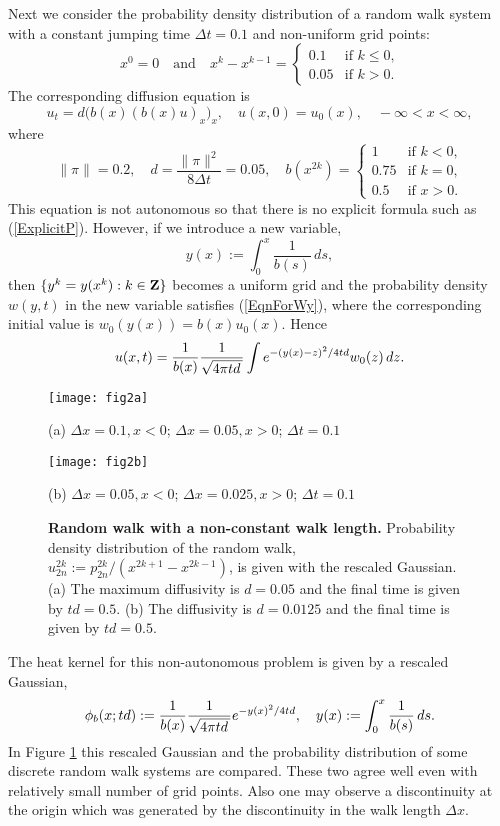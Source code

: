 \documentclass[11pt]{amsart}
\def\Z{\mathbb{Z}}
\def\d{d}
\def\Z{{\bf Z}}
\begin{document}
Next we consider the probability density distribution of a random walk system with a constant jumping time $\Delta t=0.1$ and non-uniform grid points:
\[
x^0=0\quad\text{and}\quad x^k-x^{k-1}=
\begin{cases}
0.1 & \text{if $k\leq 0$,}\\
0.05 & \text{if $k>0$.}
\end{cases}\]
The corresponding diffusion equation is
\begin{equation*}\label{EqnForU2}
u_t=\d \big(b(x)(b(x)u)_x \big)_x,\quad u(x,0)=u_0(x),\quad -\infty<x<\infty,
\end{equation*}
where
$$
\|\pi\|=0.2, \quad \d=\frac{\|\pi\|^2}{8\Delta t}=0.05, \quad b(x^{2k})=
\begin{cases}
1 & \text{if $k<0$,}\\
0.75 & \text{if $k=0$,}\\
0.5 & \text{if $x>0$.}
\end{cases}
$$
This equation is not autonomous so that there is no explicit formula such as (\ref{ExplicitP}). However, if we introduce a new variable,
\[y(x) := \int_0^{x}\frac{1}{b(s)}\,ds,\]
then $\{y^k=y(x^k):k\in\Z\}$ becomes a uniform grid and the probability density $w(y,t)$ in the new variable satisfies (\ref{EqnForWy}), where the corresponding initial value is $w_0(y(x))=b(x)u_0(x)$. Hence
\begin{equation*}\label{000}
u(x,t)={1\over b(x)} \frac{1}{\sqrt{4\pi t\d\,}} \int e^{-(y(x)-z)^2/4t\d} w_0(z)\,dz.
\end{equation*}

\begin{figure}[ht]
\centering
\begin{minipage}[t]{0.48\textwidth}
\centering
\texttt{[image: fig2a]}

(a) $\Delta x=0.1, x<0$; $\Delta x=0.05, x>0$; $\Delta t=0.1$
\end{minipage}
\begin{minipage}[t]{0.48\textwidth}
 \centering
 \texttt{[image: fig2b]}

(b) $\Delta x=0.05, x<0$; $\Delta x=0.025, x>0$; $\Delta t=0.1$
\end{minipage}
\caption{{\bf Random walk with a non-constant walk length.} Probability density distribution of the random walk, $u^{2k}_{2n}:=p^{2k}_{2n}/(x^{2k+1}-x^{2k-1})$, is given with the rescaled Gaussian. (a) The maximum diffusivity is $\d=0.05$ and the final time is given by $t\d=0.5$.  (b) The diffusivity is $\d=0.0125$ and the final time is given by $t\d=0.5$. } \label{fig2}
\end{figure}
The heat kernel for this non-autonomous problem is given by a rescaled Gaussian,
\begin{equation*}
\phi_b(x;t\d) := {1\over b(x)}\frac{1}{\sqrt{4\pi t\d\,}}e^{-y(x)^2/4t\d},\quad y(x) := \int_0^{x}\frac{1}{b(s)}\,ds.
\end{equation*}
In Figure \ref{fig2} this rescaled Gaussian and the probability distribution of some discrete random walk systems are compared. These two agree well even with relatively small number of grid points. Also one may observe a discontinuity at the origin which was generated by the discontinuity in the walk length $\Delta x$.
\end{document}
